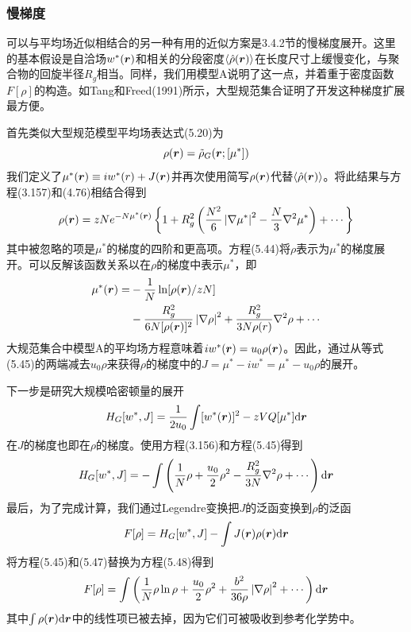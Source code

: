 \subsubsection{慢梯度}
可以与平均场近似相结合的另一种有用的近似方案是3.4.2节的慢梯度展开。这里的基本假设是自洽场$w^*(\bm{r})$和相关的分段密度$\left\langle\hat{\rho}(\bm{r})\right\rangle$在长度尺寸上缓慢变化，与聚合物的回旋半径$R_g$相当。同样，我们用模型A说明了这一点，并着重于密度函数$F[\rho]$的构造。如Tang和Freed(1991)所示，大型规范集合证明了开发这种梯度扩展最方便。

首先类似大型规范模型平均场表达式(5.20)为
\begin{equation}
\rho(\bm{r})=\tilde{\rho}_G(\bm{r};[\mu^*])
\end{equation}
我们定义了$\mu^*(\bm{r})\equiv iw^*(r)+J(\bm{r})$并再次使用简写$\rho(\bm{r})$代替$\left\langle\hat{\rho}(\bm{r})\right\rangle$。将此结果与方程(3.157)和(4.76)相结合得到
\begin{equation}
\rho(\bm{r})=zNe^{-N\mu^*(\bm{r})}\left\{1+R_g^2\left(\frac{N^2}{6}\left|\nabla\mu^*\right|^2-\frac{N}{3}\nabla^2\mu^*\right)+\cdots\right\}
\end{equation}
其中被忽略的项是$\mu^*$的梯度的四阶和更高项。方程(5.44)将$\rho$表示为$\mu^*$的梯度展开。可以反解该函数关系以在$\rho$的梯度中表示$\mu^*$，即
\begin{equation}
\begin{aligned}
\mu^*(\bm{r})=&-\frac{1}{N}\ln[\rho(\bm{r})/zN]\\
&-\frac{R_g^2}{6N[\rho(\bm{r})]^2}\left|\nabla\rho\right|^2+\frac{R_g^2}{3N\rho(r)}\nabla^2\rho+\cdots
\end{aligned}
\end{equation}
大规范集合中模型A的平均场方程意味着$iw^*(\bm{r})=u_0\rho(\bm{r})$。因此，通过从等式(5.45)的两端减去$u_0\rho$来获得$\rho$的梯度中的$J=\mu^*-iw^*=\mu^*-u_0\rho$的展开。

下一步是研究大规模哈密顿量的展开
\begin{equation}
H_G[w^*,J]=\frac{1}{2u_0}\int[w^*(\bm{r})]^2-zVQ[\mu^*]\mathrm{d}\bm{r}
\end{equation}
在$J$的梯度也即在$\rho$的梯度。使用方程(3.156)和方程(5.45)得到
\begin{equation}
H_G[w^*,J]=-\int\left(\frac{1}{N}\rho+\frac{u_0}{2}\rho^2-\frac{R_g^2}{3N}\nabla^2\rho+\cdots\right)\mathrm{d}\bm{r}
\end{equation}
最后，为了完成计算，我们通过Legendre变换把$J$的泛函变换到$\rho$的泛函
\begin{equation}
F[\rho]=H_G[w^*,J]-\int J(\bm{r})\rho(\bm{r})\mathrm{d}\bm{r}
\end{equation}
将方程(5.45)和(5.47)替换为方程(5.48)得到
\begin{equation}
F[\rho]=\int\left(\frac{1}{N}\rho\ln\rho+\frac{u_0}{2}\rho^2+\frac{b^2}{36\rho}\left|\nabla\rho\right|^2+\cdots\right)\mathrm{d}\bm{r}
\end{equation}
其中$\int\rho(\bm{r})\mathrm{d}\bm{r}$中的线性项已被去掉，因为它们可被吸收到参考化学势中。

